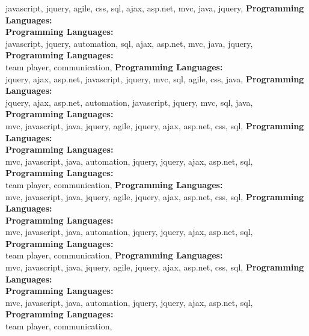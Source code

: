 javascript,  jquery, agile, css, sql, ajax, asp.net, mvc, java, jquery, \textbf{Programming Languages:} \\
\textbf{Programming Languages:} \\
javascript,  jquery, automation, sql, ajax, asp.net, mvc, java, jquery, \textbf{Programming Languages:} \\
team player,  communication, \textbf{Programming Languages:} \\
jquery, ajax, asp.net, javascript,  jquery, mvc, sql, agile, css, java, \textbf{Programming Languages:} \\
jquery, ajax, asp.net, automation, javascript,  jquery, mvc, sql, java, \textbf{Programming Languages:} \\
mvc, javascript, java, jquery, agile,  jquery, ajax, asp.net, css, sql, \textbf{Programming Languages:} \\
\textbf{Programming Languages:} \\
mvc, javascript, java, automation, jquery,  jquery, ajax, asp.net, sql, \textbf{Programming Languages:} \\
team player,  communication, \textbf{Programming Languages:} \\
mvc, javascript, java, jquery, agile,  jquery, ajax, asp.net, css, sql, \textbf{Programming Languages:} \\
\textbf{Programming Languages:} \\
mvc, javascript, java, automation, jquery,  jquery, ajax, asp.net, sql, \textbf{Programming Languages:} \\
team player,  communication, \textbf{Programming Languages:} \\
mvc, javascript, java, jquery, agile,  jquery, ajax, asp.net, css, sql, \textbf{Programming Languages:} \\
\textbf{Programming Languages:} \\
mvc, javascript, java, automation, jquery,  jquery, ajax, asp.net, sql, \textbf{Programming Languages:} \\
team player,  communication, 